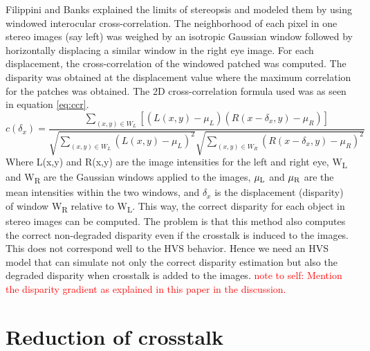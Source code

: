 Filippini and Banks \cite{filippini2009limits} explained the limits of stereopsis and modeled them by using windowed interocular cross-correlation. The neighborhood of each pixel in one stereo images (say left) was weighed by an isotropic Gaussian window followed by horizontally displacing a similar window in the right eye image. For each displacement, the cross-correlation of the windowed patched was computed. The disparity was obtained at the displacement value where the maximum correlation for the patches was obtained. The 2D cross-correlation formula used was as seen in equation \ref{eq:ccr}.
\begin{equation}
c(\delta_x) = \frac{ \sum\limits_{(x,y) \in W_L} [(L(x,y) - \mu_L)(R(x-\delta_x, y) - \mu_R)] }{\sqrt{\sum\limits_{(x,y) \in W_L}(L(x,y) - \mu_L)^2} \sqrt{\sum\limits_{(x,y) \in W_R}(R(x-\delta_x, y)- \mu_R)^2}}
\label{eq:ccr}
\end{equation}
Where L(x,y) and R(x,y) are the image intensities for the left and right eye, W\textsubscript{L} and W\textsubscript{R} are the Gaussian windows applied to the images, $\mu\textsubscript{L}$ and $\mu\textsubscript{R}$ are the mean intensities within the two windows, and $\delta_x$ is the displacement (disparity) of window W\textsubscript{R} relative to W\textsubscript{L}. This way, the correct disparity for each object in stereo images can be computed. The problem is that this method also computes the correct non-degraded disparity even if the crosstalk is induced to the images. This does not correspond well to the HVS behavior. Hence we need an HVS model that can simulate not only the correct disparity estimation but also the degraded disparity when crosstalk is added to the images. \textcolor{red}{note  to self: Mention the disparity gradient as explained in this paper in the discussion.}

\section{Reduction of crosstalk}

